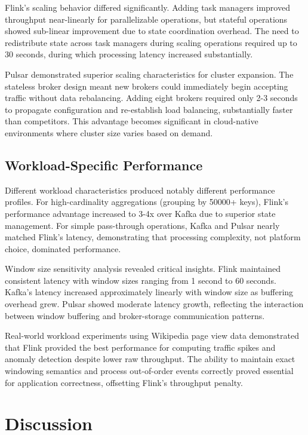 \documentclass[10pt,twocolumn]{article}
\begin{document}
Flink's scaling behavior differed significantly. Adding task managers improved throughput near-linearly for parallelizable operations, but stateful operations showed sub-linear improvement due to state coordination overhead. The need to redistribute state across task managers during scaling operations required up to 30 seconds, during which processing latency increased substantially.

Pulsar demonstrated superior scaling characteristics for cluster expansion. The stateless broker design meant new brokers could immediately begin accepting traffic without data rebalancing. Adding eight brokers required only 2-3 seconds to propagate configuration and re-establish load balancing, substantially faster than competitors. This advantage becomes significant in cloud-native environments where cluster size varies based on demand.

\subsection{Workload-Specific Performance}

Different workload characteristics produced notably different performance profiles. For high-cardinality aggregations (grouping by 50000+ keys), Flink's performance advantage increased to 3-4x over Kafka due to superior state management. For simple pass-through operations, Kafka and Pulsar nearly matched Flink's latency, demonstrating that processing complexity, not platform choice, dominated performance.

Window size sensitivity analysis revealed critical insights. Flink maintained consistent latency with window sizes ranging from 1 second to 60 seconds. Kafka's latency increased approximately linearly with window size as buffering overhead grew. Pulsar showed moderate latency growth, reflecting the interaction between window buffering and broker-storage communication patterns.

Real-world workload experiments using Wikipedia page view data demonstrated that Flink provided the best performance for computing traffic spikes and anomaly detection despite lower raw throughput. The ability to maintain exact windowing semantics and process out-of-order events correctly proved essential for application correctness, offsetting Flink's throughput penalty.

\section{Discussion}
\end{document}

